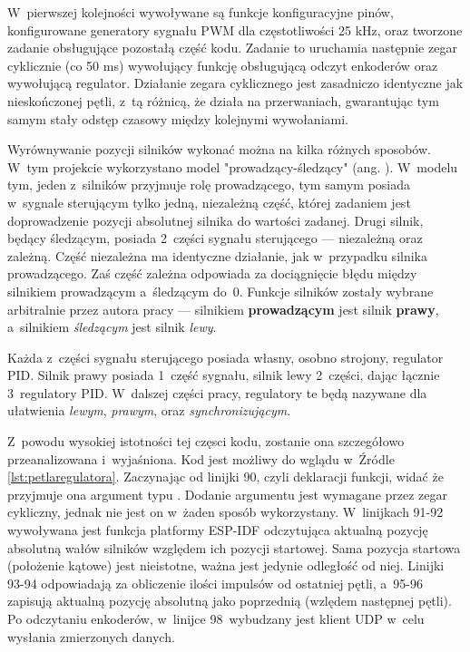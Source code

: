 W~pierwszej kolejności wywoływane są funkcje konfiguracyjne pinów, konfigurowane generatory sygnału PWM dla częstotliwości 25 kHz, oraz tworzone zadanie obsługujące pozostałą część kodu. Zadanie to uruchamia następnie zegar cyklicznie (co 50 ms) wywołujący funkcję obsługującą odczyt enkoderów oraz wywołującą regulator. Działanie zegara cyklicznego jest zasadniczo identyczne jak nieskończonej pętli, z~tą różnicą, że działa na przerwaniach, gwarantując tym samym stały odstęp czasowy między kolejnymi wywołaniami.

Wyrównywanie pozycji silników wykonać można na kilka różnych sposobów. W~tym projekcie wykorzystano model "prowadzący-śledzący" (ang. ). W~modelu tym, jeden z~silników przyjmuje rolę prowadzącego, tym samym posiada w~sygnale sterującym tylko jedną, niezależną część, której zadaniem jest doprowadzenie pozycji absolutnej silnika do wartości zadanej. Drugi silnik, będący śledzącym, posiada 2~części sygnału sterującego --- niezależną oraz zależną. Część niezależna ma identyczne działanie, jak w~przypadku silnika prowadzącego. Zaś część zależna odpowiada za dociągnięcie błędu między silnikiem prowadzącym a~śledzącym do~0. Funkcje silników zostały wybrane arbitralnie przez autora pracy --- silnikiem \textbf{prowadzącym} jest silnik \textbf{prawy}, a~silnikiem \textit{śledzącym} jest silnik \textit{lewy}.

Każda z~części sygnału sterującego posiada własny, osobno strojony, regulator PID. Silnik prawy posiada 1~część sygnału, silnik lewy 2~części, dając łącznie 3~regulatory PID. W~dalszej części pracy, regulatory te będą nazywane dla ułatwienia \textit{lewym}, \textit{prawym}, oraz \textit{synchronizującym}.

Z~powodu wysokiej istotności tej częsci kodu, zostanie ona szczegółowo przeanalizowana i~wyjaśniona. Kod jest możliwy do wglądu w~Źródle \ref{lst:petlaregulatora}. Zaczynając od linijki 90, czyli deklaracji funkcji, widać że przyjmuje ona argument typu . Dodanie argumentu jest wymagane przez zegar cykliczny, jednak nie jest on w~żaden sposób wykorzystany. W~linijkach 91-92 wywoływana jest funkcja platformy ESP-IDF odczytująca aktualną pozycję absolutną wałów silników względem ich pozycji startowej. Sama pozycja startowa (położenie kątowe) jest nieistotne, ważna jest jedynie odległość od niej. Linijki 93-94 odpowiadają za obliczenie ilości impulsów od ostatniej pętli, a~95-96 zapisują aktualną pozycję absolutną jako poprzednią (wzlędem następnej pętli). Po odczytaniu enkoderów, w~linijce 98~wybudzany jest klient UDP w~celu wysłania zmierzonych danych.

